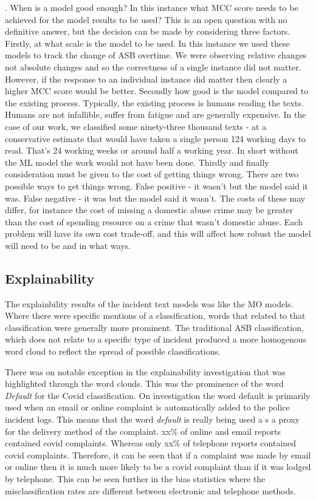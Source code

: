  
 . When is a model good enough? In this instance what MCC score needs to be achieved for the model results to be used? This is an open question with no definitive answer, but the decision can be made by considering three factors. Firstly, at what scale is the model to be used. In this instance we used these models to track the change of ASB overtime. We were observing relative changes not absolute changes and so the correctness of a single instance did not matter. However, if the response to an individual instance did matter then clearly a higher MCC score would be better. Secondly how good is the model compared to the existing process. Typically, the existing process is humans reading the texts. Humans are not infallible, suffer from fatigue and are generally expensive. In the case of our work, we classified some ninety-three thousand texts - at a conservative estimate that would have taken a single person 124 working days to read. That's 24 working weeks or around half a working year. In short without the ML model the work would not have been done. Thirdly and finally consideration must be given to the cost of getting things wrong. There are two possible ways to get things wrong. False positive - it wasn't but the model said it was. False negative - it was but the model said it wasn't. The costs of these may differ, for instance the cost of missing a domestic abuse crime may be greater than the cost of spending resource on a crime that wasn't domestic abuse. Each problem will have its own cost trade-off, and this will affect how robust the model will need to be and in what ways.


\subsection{Explainability} The explainbility results of the incident text models was like the MO models. Where there were specific mentions of a classification, words that related to that classification were generally more prominent. The traditional ASB classification,  which does not relate to a specific type of incident produced a more homogenous word cloud to reflect the spread of possible classifications. 

There was on notable exception in the explainability investigation that was highlighted through the word clouds. This was the prominence of the word \emph{Default} for the Covid classification. On investigation the word default is primarily used when an email or online complaint is automatically added to the police incident logs. This means that the word \emph{default} is really being used a s a proxy for the delivery method of the complaint.  xx\% of online and email reports contained covid complaints.  Whereas only xx\% of  telephone reports contained covid complaints. Therefore, it can be seen that if a complaint was made by email or online then it is much more likely to be a covid complaint than if it was lodged by telephone.   This can be seen further in the bias statistics where the misclassification rates are different between electronic and telephone methods. 

